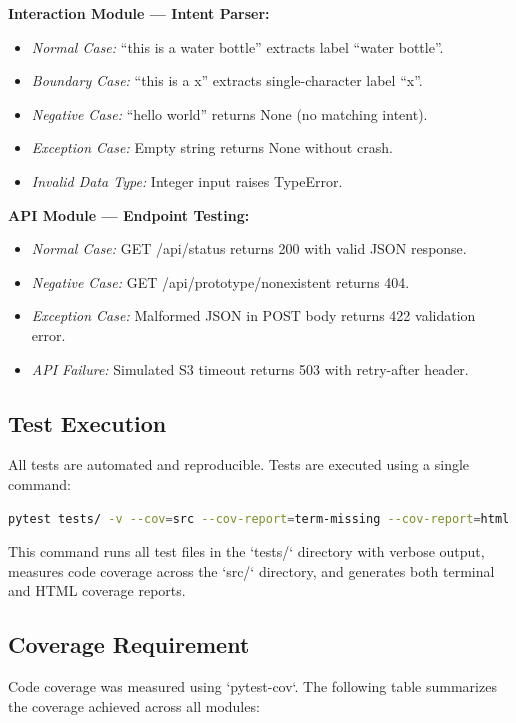 \documentclass[12pt,a4paper]{report}
\begin{document}
\textbf{Interaction Module --- Intent Parser:}
\begin{itemize}
    \item \textit{Normal Case:} ``this is a water bottle'' extracts label ``water bottle''.
    \item \textit{Boundary Case:} ``this is a x'' extracts single-character label ``x''.
    \item \textit{Negative Case:} ``hello world'' returns None (no matching intent).
    \item \textit{Exception Case:} Empty string returns None without crash.
    \item \textit{Invalid Data Type:} Integer input raises TypeError.
\end{itemize}

\textbf{API Module --- Endpoint Testing:}
\begin{itemize}
    \item \textit{Normal Case:} GET /api/status returns 200 with valid JSON response.
    \item \textit{Negative Case:} GET /api/prototype/nonexistent returns 404.
    \item \textit{Exception Case:} Malformed JSON in POST body returns 422 validation error.
    \item \textit{API Failure:} Simulated S3 timeout returns 503 with retry-after header.
\end{itemize}

\subsection{Test Execution}
All tests are automated and reproducible. Tests are executed using a single command:

\begin{lstlisting}[language=bash, caption={Test execution command}]
pytest tests/ -v --cov=src --cov-report=term-missing --cov-report=html
\end{lstlisting}

This command runs all test files in the `tests/` directory with verbose output, measures code coverage across the `src/` directory, and generates both terminal and HTML coverage reports.

\subsection{Coverage Requirement}
Code coverage was measured using `pytest-cov`. The following table summarizes the coverage achieved across all modules:
\end{document}
